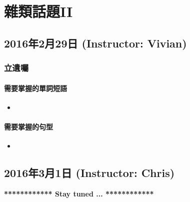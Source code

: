 \chapter{雜類話題II}
\section{2016年2月29日 (Instructor: Vivian)}
\subsection{立遺囑}
\subsubsection*{需要掌握的單詞短語}
\begin{itemize}
  \itemsep0em
  \item 
\end{itemize}

\subsubsection*{需要掌握的句型}
\begin{itemize}
  \itemsep0em
  \item 
\end{itemize}

\section{2016年3月1日 (Instructor: Chris)}

\vspace{15mm}
\begin{center}
  \textbf{************ Stay tuned ... ************}
\end{center}
